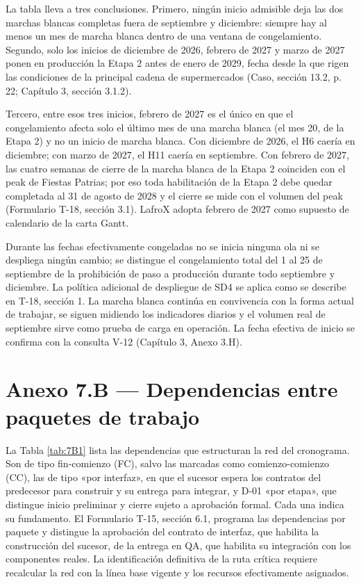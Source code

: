 
La tabla lleva a tres conclusiones. Primero, ningún inicio admisible deja las dos marchas blancas completas fuera de septiembre y diciembre: siempre hay al menos un mes de marcha blanca dentro de una ventana de congelamiento. Segundo, solo los inicios de diciembre de 2026, febrero de 2027 y marzo de 2027 ponen en producción la Etapa 2 antes de enero de 2029, fecha desde la que rigen las condiciones de la principal cadena de supermercados (Caso, sección 13.2, p. 22; Capítulo 3, sección 3.1.2).

Tercero, entre esos tres inicios, febrero de 2027 es el único en que el congelamiento afecta solo el último mes de una marcha blanca (el mes 20, de la Etapa 2) y no un inicio de marcha blanca. Con diciembre de 2026, el H6 caería en diciembre; con marzo de 2027, el H11 caería en septiembre. Con febrero de 2027, las cuatro semanas de cierre de la marcha blanca de la Etapa 2 coinciden con el peak de Fiestas Patrias; por eso toda habilitación de la Etapa 2 debe quedar completada al 31 de agosto de 2028 y el cierre se mide con el volumen del peak (Formulario T-18, sección 3.1). LafroX adopta febrero de 2027 como supuesto de calendario de la carta Gantt.

Durante las fechas efectivamente congeladas no se inicia ninguna ola ni se despliega ningún cambio; se distingue el congelamiento total del 1 al 25 de septiembre de la prohibición de paso a producción durante todo septiembre y diciembre. La política adicional de despliegue de SD4 se aplica como se describe en T-18, sección 1. La marcha blanca continúa en convivencia con la forma actual de trabajar, se siguen midiendo los indicadores diarios y el volumen real de septiembre sirve como prueba de carga en operación. La fecha efectiva de inicio se confirma con la consulta V-12 (Capítulo 3, Anexo 3.H).

\section{Anexo 7.B — Dependencias entre paquetes de trabajo}

La Tabla \ref{tab:7B1} lista las dependencias que estructuran la red del cronograma. Son de tipo fin-comienzo (FC), salvo las marcadas como comienzo-comienzo (CC), las de tipo «por interfaz», en que el sucesor espera los contratos del predecesor para construir y su entrega para integrar, y D-01 «por etapa», que distingue inicio preliminar y cierre sujeto a aprobación formal. Cada una indica su fundamento. El Formulario T-15, sección 6.1, programa las dependencias por paquete y distingue la aprobación del contrato de interfaz, que habilita la construcción del sucesor, de la entrega en QA, que habilita su integración con los componentes reales. La identificación definitiva de la ruta crítica requiere recalcular la red con la línea base vigente y los recursos efectivamente asignados.


